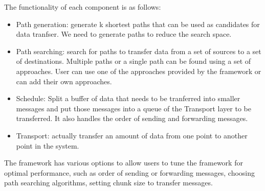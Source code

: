 The functionality of each component is as follows:
\begin{itemize}
\item Path generation: generate k shortest paths that can be used as candidates for data tranfser. We need to generate paths to reduce the search space.
\item Path searching: search for paths to transfer data from a set of sources to a set of destinations. Multiple paths or a single path can be found using a set of approaches. User can use one of the approaches provided by the framework or can add their own approaches.

\item Schedule: Split a buffer of data that needs to be tranferred into smaller messages and put those messages into a queue of the Transport layer to be transferred. It also handles the order of sending and forwarding messages.

\item Transport: actually transfer an amount of data from one point to another point in the system.

\end{itemize}

The framework has various options to allow users to tune the framework for optimal performance, such as order of sending or forwarding messages, choosing path searching algorithms, setting chunk size to transfer messages. 
